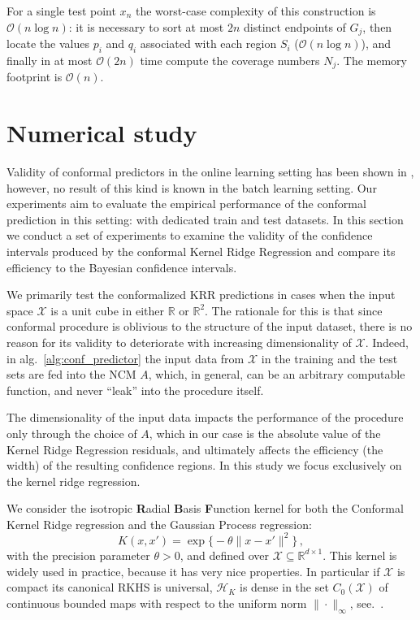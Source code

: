 \documentclass[a4paper,14pt]{extarticle}
\newcommand{\Hcal}{\mathcal{H}}
\newcommand{\Xcal}{\mathcal{X}}
\newcommand{\Real}{\mathbb{R}}
\begin{document}
For a single test point $x_n$ the worst-case complexity of this construction is
$\mathcal{O}(n \log n)$: it is necessary to sort at most $2n$ distinct endpoints
of $G_j$, then locate the values $p_i$ and $q_i$ associated with each region $S_i$
($\mathcal{O}(n\log n)$), and finally in at most $\mathcal{O}(2n)$ time compute
the coverage numbers $N_j$. The memory footprint is $\mathcal{O}(n)$.



\section{Numerical study} %
\label{sec:numerical_study}

Validity of conformal predictors in the online learning setting has been shown in
\cite{vovk2005}, however, no result of this kind is known in the batch learning setting.
Our experiments aim to evaluate the empirical performance of the conformal prediction
in this setting: with dedicated train and test datasets. In this section we conduct
a set of experiments to examine the validity of the confidence intervals produced
by the conformal Kernel Ridge Regression and compare its efficiency to the Bayesian
confidence intervals.

We primarily test the conformalized KRR predictions in cases when the input space
$\Xcal$ is a unit cube in either $\Real$ or $\Real^2$. The rationale for this is
that since conformal procedure is oblivious to the structure of the input dataset,
there is no reason for its validity to deteriorate with increasing dimensionality
of $\Xcal$. Indeed, in alg.~\ref{alg:conf_predictor} the input data from $\Xcal$
in the training and the test sets are fed into the NCM $A$, which, in general, can
be an arbitrary computable function, and never ``leak'' into the procedure itself.

The dimensionality of the input data impacts the performance of the procedure only
through the choice of $A$, which in our case is the absolute value of the Kernel
Ridge Regression residuals, and ultimately affects the efficiency (the width) of
the resulting confidence regions. In this study we focus exclusively on the kernel
ridge regression.

We consider the isotropic \textbf{R}adial \textbf{B}asis \textbf{F}unction kernel
for both the Conformal Kernel Ridge regression and the Gaussian Process regression:
\begin{equation*}
  K(x,x')
  = \mathop{\text{exp}}\bigl\{-\theta \|x-x' \|^2\bigr\}
  \,,
\end{equation*}
with the precision parameter $\theta>0$, and defined over $\Xcal \subseteq \Real^{d\times 1}$.
This kernel is widely used in practice, because it has very nice properties. In
particular if $\Xcal$ is compact its canonical RKHS is universal, $\Hcal_K$ is dense
in the set $C_0(\Xcal)$ of continuous bounded maps with respect to the uniform norm
$\|\cdot\|_\infty$, see.~\cite{ref:rbf_universal}.
\end{document}
